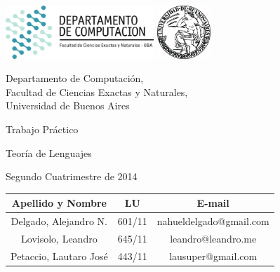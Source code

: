 \documentclass[a4paper, 10pt, twoside]{article}
\newcommand{\titulo}{Trabajo Práctico}
\newcommand{\materia}{Teoría de Lenguajes}
\newcommand{\cuatrimestre}{Segundo Cuatrimestre de 2014}
\begin{document}


\thispagestyle{caratula}

\begin{center}

\includegraphics[height=2cm]{DC.png} 
\hfill
\includegraphics[height=2cm]{UBA.jpg} 

\vspace{2cm}

Departamento de Computación,\\
Facultad de Ciencias Exactas y Naturales,\\
Universidad de Buenos Aires

\vspace{4cm}

\begin{Huge}
\titulo
\end{Huge}

\vspace{0.5cm}

\begin{Large}
\materia
\end{Large}

\vspace{1cm}

\cuatrimestre

\vspace{4cm}

\begin{tabular}{|c|c|c|}
\hline
Apellido y Nombre & LU & E-mail\\
\hline
Delgado, Alejandro N.  & 601/11 & nahueldelgado@gmail.com\\
Lovisolo, Leandro      & 645/11 & leandro@leandro.me\\
Petaccio, Lautaro José & 443/11 & lausuper@gmail.com\\
\hline
\end{tabular}

\end{center}
\end{document}
